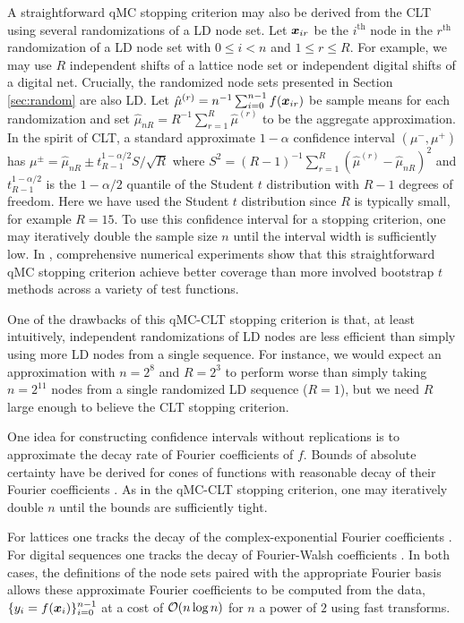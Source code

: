 \documentclass{svproc}
\begin{document}
A straightforward qMC stopping criterion may also be derived from the CLT using several randomizations of a LD node set. Let ${\boldsymbol{x}}_{ir}$ be the $i^\mathrm{th}$ node in the $r^\mathrm{th}$ randomization of a LD node set with $0 \leq i < n$ and $1 \leq r \leq R$. For example, we may use $R$ independent shifts of a lattice node set or independent digital shifts of a digital net. Crucially, the randomized node sets presented in Section \ref{sec:random} are also LD. Let $\hat{\mu}^{(r)} = n^{-1} \sum_{i=0}^{n-1} f({\boldsymbol{x}}_{ir})$ be sample means for each randomization and set $\hat{\mu}_{nR} = R^{-1} \sum_{r=1}^R \hat{\mu}^{(r)}$ to be the aggregate approximation. In the spirit of CLT, a standard approximate $1-\alpha$ confidence interval $(\mu^-,\mu^+)$ has $\mu^\pm = \hat{\mu}_{nR} \pm t_{R-1}^{1-\alpha/2} S/\sqrt{R}$ where $S^2 = (R-1)^{-1} \sum_{r=1}^R (\hat{\mu}^{(r)} - \hat{\mu}_{nR})^2$ and $t_{R-1}^{1-\alpha/2}$ is the $1-\alpha/2$ quantile of the Student $t$ distribution with $R-1$ degrees of freedom. Here we have used the Student $t$ distribution since $R$ is typically small, for example $R=15$. To use this confidence interval for a stopping criterion, one may iteratively double the sample size $n$ until the interval width is sufficiently low. In \cite{l2023confidence}, comprehensive numerical experiments show that this straightforward qMC stopping criterion achieve better coverage than more involved bootstrap $t$ methods across a variety of test functions. 

One of the drawbacks of this qMC-CLT stopping criterion is that, at least intuitively, independent randomizations of LD nodes are less efficient than simply using more LD nodes from a single sequence. For instance, we would expect an approximation with $n=2^8$ and $R=2^3$ to perform worse than simply taking $n=2^{11}$ nodes from a single randomized LD sequence ($R=1$), but we need $R$ large enough to believe the CLT stopping criterion. 

One idea for constructing confidence intervals without replications is to approximate the decay rate of Fourier coefficients of $f$. Bounds of absolute certainty have be derived for cones of functions with reasonable decay of their Fourier coefficients \cite{HicEtal17a}. As in the qMC-CLT stopping criterion, one may iteratively double $n$ until the bounds are sufficiently tight. 

For lattices one tracks the decay of the complex-exponential Fourier coefficients \cite{JimHic16a}. For digital sequences one tracks the decay of  Fourier-Walsh coefficients  \cite{HicJim16a}. In both cases, the definitions of the node sets paired with the appropriate Fourier basis allows these approximate Fourier coefficients to be computed from the data, $\{y_i = f({\boldsymbol{x}}_i)\}_{i=0}^{n -1} $ at a cost of ${\mathcal{O}}(n \log n)$ for $n$ a power of $2$ using fast  transforms. 
\end{document}
